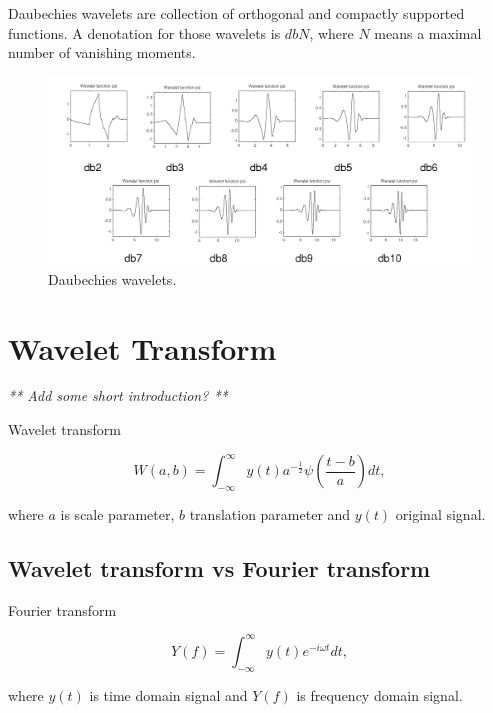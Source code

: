 \begin{defn}
Daubechies wavelets are collection of orthogonal and compactly supported functions. A denotation for those wavelets is $dbN$, where $N$ means a maximal number of vanishing moments.
\end{defn}

\begin{figure}[h]
	\centering
	\includegraphics[width=\textwidth]{DB_N.png}
	\caption{Daubechies wavelets.}
	\label{fig:db_wavelets}
\end{figure}

\section{Wavelet Transform}

\textit{** Add some short introduction? **}

\begin{defn}
Wavelet transform

\begin{equation}
W(a,b)=\int_{-\infty}^{\infty} y(t) a^{-\frac{1}{2}} \psi\left(\frac{t-b}{a}\right) dt,
\end{equation}

where $a$ is scale parameter, $b$ translation parameter and $y(t)$ original signal.
\end{defn}

\subsection{Wavelet transform vs Fourier transform}

\begin{defn}
Fourier transform

\begin{equation}
Y(f)=\int_{-\infty}^{\infty} y(t) e^{-i\omega t} dt,
\end{equation}

where $y(t)$ is time domain signal and $Y(f)$ is frequency domain signal.
\end{defn}

